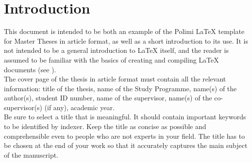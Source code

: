 \documentclass[11pt,a4paper]{article}
\begin{document}



\section{Introduction}
\label{sec:introduction}
This document is intended to be both an example of the Polimi \LaTeX{} template for Master Theses in article format,
as well as a short introduction to its use. It is not intended to be a general introduction to \LaTeX{} itself,
and the reader is assumed to be familiar with the basics of creating and compiling \LaTeX{} documents (see \cite{oetiker1995not, kottwitz2015latex}). 
\\
The cover page of the thesis in article format must contain all the relevant information:
title of the thesis, name of the Study Programme, name(s) of the author(s),
student ID number, name of the supervisor, name(s) of the co-supervisor(s) (if any), academic year.
\\
Be sure to select a title that is meaningful.
It should contain important keywords to be identified by indexer.
Keep the title as concise as possible and comprehensible even to people who are not experts in your field.
The title has to be chosen at the end of your work so that it accurately captures the main subject of the manuscript.
\end{document}
